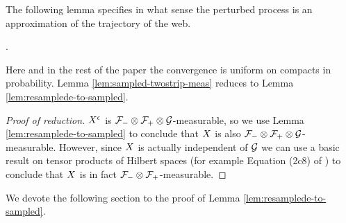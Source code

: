 {The following lemma specifies in what sense the perturbed process is
an approximation of the trajectory of the web.

\begin{lemma}
  \label{lem:resamplede-to-sampled}
  \statementoflemresampledetosampled.
\end{lemma}
Here and in the rest of the paper the convergence is uniform
on compacts in probability.
Lemma \ref{lem:sampled-twostrip-meas} reduces to Lemma
\ref{lem:resamplede-to-sampled}.

\begin{proof}[Proof of reduction]
  $X^{\epsilon}$ is $\mathcal{F}_{-} \otimes \mathcal{F}_{+} \otimes \mathcal{G}$-measurable, so we use Lemma
  \ref{lem:resamplede-to-sampled} to conclude that $X$ is also
  $\mathcal{F}_{-} \otimes \mathcal{F}_{+} \otimes \mathcal{G}$-measurable.  However, since $X$ is
  actually independent of $\mathcal{G}$ we can use a basic result on
  tensor products of Hilbert spaces (for example Equation (2c8) of
  \cite{tsirelson-noise-as-a-boolean-algebra}) to conclude that $X$ is
  in fact $\mathcal{F}_{-} \otimes \mathcal{F}_{+}$-measurable.
\end{proof}

We devote the following section to the proof of Lemma
\ref{lem:resamplede-to-sampled}.
}
